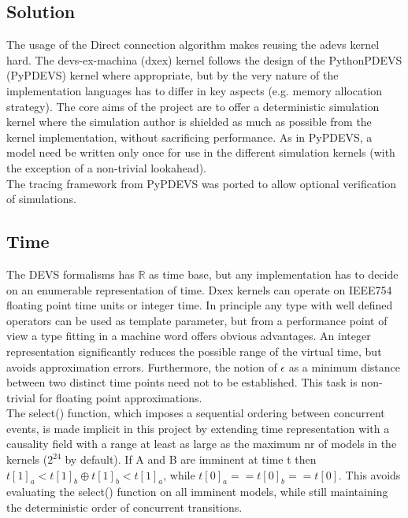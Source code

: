 \subsection{Solution} %
The usage of the Direct connection algorithm makes reusing the adevs kernel hard.
The devs-ex-machina (dxex) kernel follows the design of the PythonPDEVS \cite{PythonPDEVS}(PyPDEVS) kernel where appropriate, but by the very nature of the implementation languages has to differ in key aspects (e.g. memory allocation strategy). 
The core aims of the project are to offer a deterministic simulation kernel where the simulation author is shielded as much as possible from the kernel implementation, without sacrificing performance. As in PyPDEVS, a model need be written only once for use in the different simulation kernels (with the exception of a non-trivial lookahead).\\
The tracing framework from PyPDEVS was ported to allow optional verification of simulations. 
\subsection{Time}
The DEVS formalisms has $\mathbb{R}$ as time base, but any implementation has to decide on an enumerable representation of time. Dxex kernels can operate on IEEE754 floating point time units or integer time. In principle any type with well defined operators can be used as template parameter, but from a performance point of view a type fitting in a machine word offers obvious advantages.%
An integer representation significantly reduces the possible range of the virtual time, but avoids approximation errors. Furthermore, the notion of $\epsilon$ as a minimum distance between two distinct time points need not to be established. This task is non-trivial for floating point approximations.\\
The select() function, which imposes a sequential ordering between concurrent events, is made implicit in this project by extending time representation with a causality field with a range at least as large as the maximum nr of models in the kernels ($2^{24}$ by default). If A and B are imminent at time t then $t[1]_a < t[1]_b \oplus t[1]_b < t[1]_a$, while $t[0]_a == t[0]_b == t[0]$. This avoids evaluating the select() function on all imminent models, while still maintaining the deterministic order of concurrent transitions.
